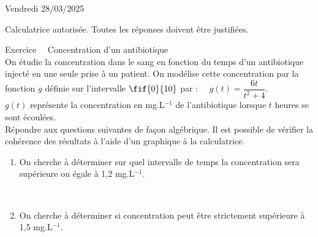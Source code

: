 \documentclass[a4paper,11pt,eval]{nsi}
\newcounter{exoNum}
\newcommand{\exo}[1]
{
	\addtocounter{exoNum}{1}
	{\titlefont\color{UGLiBlue}\Large Exercice\ \theexoNum\ \normalsize{#1}}\smallskip	
}
\begin{document}
\textcolor{UGLiBlue}{Vendredi 28/03/2025}\\
\maketitle
\begin{center}
	Calculatrice autorisée. Toutes les réponses doivent être justifiées.
\end{center}

\vspace{1cm}


\exo{ Concentration d'un antibiotique}\\
On étudie la concentration dans le sang en fonction du temps d'un antibiotique injecté en une seule prise à un patient. On modélise cette concentration par la fonction $g$ définie sur l'intervalle $\fif{0}{10}$ par : $\quad g(t)=\dfrac{6t}{t^2+4}$.\\
$g(t)$ représente la concentration en mg.L$^{-1}$ de l'antibiotique lorsque $t$ heures se sont écoulées.\\[.5em]
Répondre aux questions suivantes de façon algébrique. Il est possible de vérifier la cohérence des résultats à l'aide d'un graphique à la calculatrice.
\begin{enumerate}
    \item On cherche à déterminer sur quel intervalle de temps la concentration sera supérieure ou égale à 1,2 mg.L$^{-1}$.
        \carreauxseyes{16cm}{8.8cm}\\
        \carreauxseyes{16cm}{12cm}

    \item On cherche à déterminer si concentration peut être strictement supérieure à 1,5 mg.L$^{-1}$.
    \carreauxseyes{16cm}{9.6cm}\\
    \carreauxseyes{16cm}{8cm}
\end{enumerate}
\end{document}
